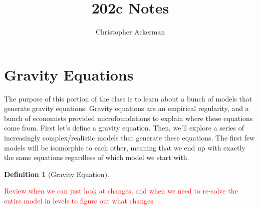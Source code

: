 \documentclass{article}
\title{202c Notes}
\author{Christopher Ackerman}
\newtheorem*{definition}{Definition}
\newcommand{\rd}{\textcolor{red}}
\begin{document}
 \maketitle
 \newpage
 \section{Gravity Equations}
 The purpose of this portion of the class is to learn about a bunch of models that generate gravity equations. Gravity equations are an empirical regularity, and a bunch of economists provided microfoundations to explain where these equations come from. First let's define a gravity equation. Then, we'll explore a series of increasingly complex/realistic models that generate these equations. The first few models will be isomorphic to each other, meaning that we end up with exactly the same equations regardless of which model we start with.

 \begin{definition}[Gravity Equation]
   
 \end{definition}
 \rd{Review when we can just look at changes, and when we need to re-solve the entire model in levels to figure out what changes.}
\end{document}
